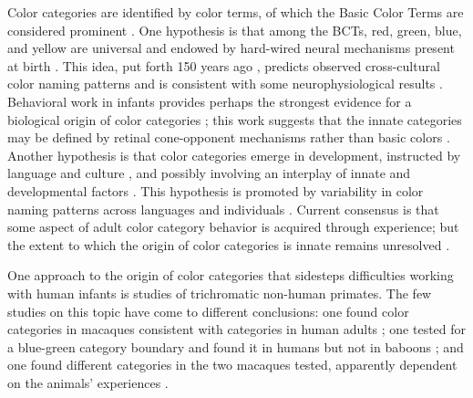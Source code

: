 Color categories are identified by color terms, of which the Basic Color Terms are considered prominent \citep{berlin_basic_1969}.
One hypothesis is that among the BCTs, red, green, blue, and yellow are universal \citep{heider_universals_1972,regier_focal_2005}
and endowed by hard-wired neural mechanisms present at birth \citep{bornstein_categories_1976,lindsey_universality_2006}. 
This idea, put forth 150 years ago \citep{hering_zur_1875}, predicts observed cross-cultural color naming patterns \citep{jameson_evolutionary_2009,baronchelli_modeling_2010,lindsey_hunter-gatherer_2015,abbott_focal_2016}
and is consistent with some neurophysiological results \citep{clifford_electrophysiological_2009,holmes_neurophysiological_2009,brouwer_categorical_2013,bird_categorical_2014,yang_cortical_2016,forder_colour_2017}
. 
Behavioral work in infants provides perhaps the strongest evidence for a biological origin of color categories \citep{franklin_new_2004,ozturk_language_2013}; this work suggests that the innate categories may be defined by retinal cone-opponent mechanisms rather than basic colors \citep{skelton_biological_2017,maule_color_2019}.
Another hypothesis is that color categories emerge in development, instructed by language and culture \citep{roberson_color_2005, regier_language_2009, cibelli_sapir-whorf_2016}, and possibly involving an interplay of innate and developmental factors \citep{kay_language_2006,franklin_lateralization_2008,regier_language_2009}. 
This hypothesis is promoted by variability in color naming patterns across languages and individuals \citep{davidoff_colour_1999,roberson_color_2000,paramei_online_2018,webster_variations_2002}.
Current consensus is that some aspect of adult color category behavior is acquired through experience; but the extent to which the origin of color categories is innate remains unresolved \citep{davidoff_nature_2009,skelton_colour_2023}.

One approach to the origin of color categories that sidesteps difficulties working with human infants is studies of trichromatic non-human primates. 
The few studies on this topic have come to different conclusions: one found color categories in macaques consistent with categories in human adults \citep{sandell_color_1979}; one tested for a blue-green category boundary and found it in humans but not in baboons \citep{fagot_cross-species_2006}; and one found different categories in the two macaques tested, apparently dependent on the animals’ experiences \citep{panichello_error-correcting_2019}.

